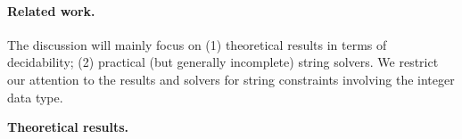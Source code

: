 
%
%
%
%
%
 

\paragraph*{Related work.}
The discussion will mainly focus on (1) theoretical results in terms of decidability; %
(2) practical (but generally incomplete) string solvers.  We restrict our attention to the results and solvers for string constraints involving the integer data type.

\smallskip 
\noindent\textbf{Theoretical results.}
%
%
%
